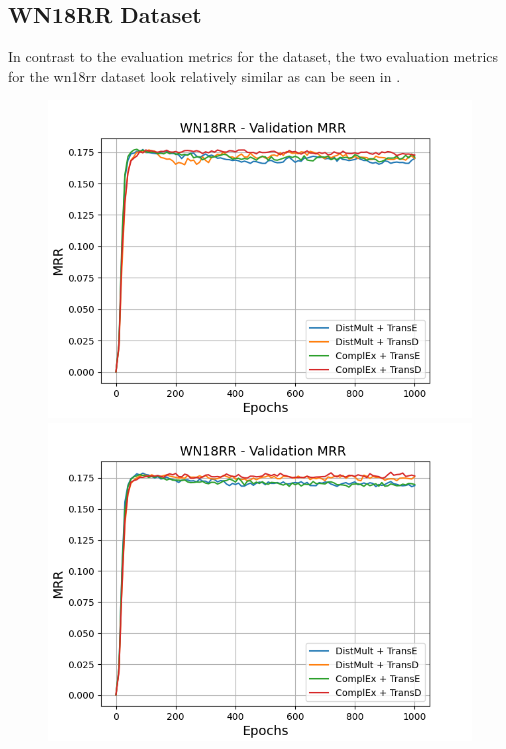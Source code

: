 \subsection{WN18RR Dataset}
\label{subsec:methods_wn18rr}

In contrast to the evaluation metrics for the \umls dataset, the two evaluation metrics for the wn18rr dataset look relatively similar as can be seen in .
\begin{figure}
    \centering
    \begin{minipage}{.5\textwidth}
      \centering
      \includegraphics[width=0.9\linewidth]{figures/results/gan_train/not_pretrained/uncertainty/max/entropy/wn18rr/1k_epochs/uncertainty_wn18rr_mrrs.png}
    \end{minipage}%
    \begin{minipage}{.5\textwidth}
      \centering
      \includegraphics[width=0.9\linewidth]{figures/results/gan_train/not_pretrained/uncertainty/max_distribution/entropy/wn18rr/1k_epochs/uncertainty_wn18rr_mrrs.png}

\end{minipage}
\end{figure}
